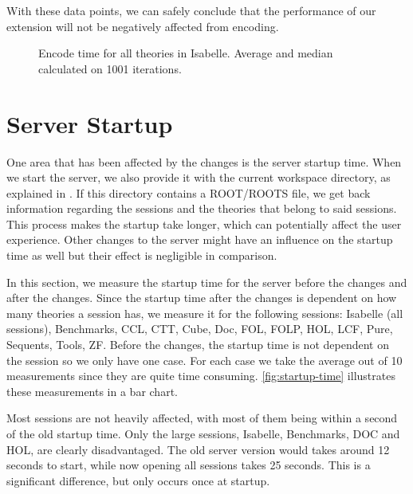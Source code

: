 With these data points, we can safely conclude that the performance of our extension will not be negatively affected from encoding.

\begin{figure}[ht]
    \centering
    \caption{Encode time for all theories in Isabelle. Average and median calculated on 1001 iterations.}
    \label{fig:encode-time}
\end{figure}

\section{Server Startup}
\label{section:startup}
One area that has been affected by the changes is the server startup time. When we start the server, we also provide it with the current workspace directory, as explained in . If this directory contains a ROOT/ROOTS file, we get back information regarding the sessions and the theories that belong to said sessions. This process makes the startup take longer, which can potentially affect the user experience. Other changes to the server might have an influence on the startup time as well but their effect is negligible in comparison.  

In this section, we measure the startup time for the server before the changes and after the changes. Since the startup time after the changes is dependent on how many theories a session has, we measure it for the following sessions: Isabelle (all sessions), Benchmarks, CCL, CTT, Cube, Doc, FOL, FOLP, HOL, LCF, Pure, Sequents, Tools, ZF. Before the changes, the startup time is not dependent on the session so we only have one case. For each case we take the average out of 10 measurements since they are quite time consuming. \autoref{fig:startup-time} illustrates these measurements in a bar chart.

Most sessions are not heavily affected, with most of them being within a second of the old startup time. Only the large sessions, Isabelle, Benchmarks, DOC and HOL, are clearly disadvantaged. The old server version would takes around 12 seconds to start, while now opening all sessions takes 25 seconds. This is a significant difference, but only occurs once at startup.


